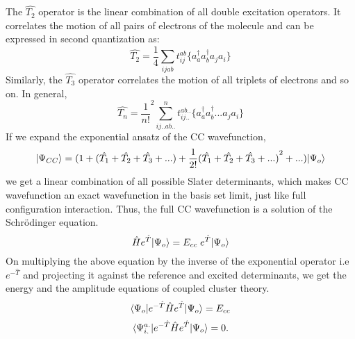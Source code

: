 The $\hat{T_2} $ operator is the linear combination of all double excitation operators.
It correlates the motion of all pairs of electrons of the molecule and can be expressed
in second quantization as:
\begin{equation}
\hat{T_2} = \frac{1}{4}\sum_{ijab}t^{ab}_{ij}\{a^\dagger_aa^\dagger_ba_ja_i\}
\end{equation}
Similarly, the ${\hat{T_3}}$ operator correlates the motion of all triplets of
electrons and so on. In general, \begin{equation}
\hat{T_n} = {\frac{1}{n!}}^2\sum_{ij..ab..}^nt^{ab..}_{ij..}\{a^\dagger_aa^\dagger_b...a_ja_i\}
\end{equation}
If we expand the exponential ansatz of the CC wavefunction,
\begin{equation}
| \Psi_{CC} \rangle = (1+(\hat{T_1} + \hat{T_2} + \hat{T_3} + ... ) + \frac{1}{2!}{(\hat{T_1} + \hat{T_2} + \hat{T_3} + ...)}^2 + ... )| \Psi_o \rangle
\end{equation}
we get a linear combination of all possible Slater determinants, which makes CC
wavefunction an exact wavefunction in the basis set limit, just like full
configuration interaction. Thus, the full CC
wavefunction is a solution of the Schr\"odinger equation.
\begin{equation}
\hat{H}e^{\hat{T}}| \Psi_o \rangle = E_{cc}\;e^{\hat{T}}| \Psi_o \rangle
\end{equation}
On multiplying the above equation by the inverse of the exponential operator i.e
$e^{-\hat{T}}$ and projecting it against the reference and excited
determinants, we get the energy and the amplitude equations of coupled cluster
theory.
\begin {equation}
\langle \Psi_o |e^{-\hat{T}}\hat{H}e^{\hat{T}}| \Psi_o \rangle = E_{cc}
\end{equation}
\begin{equation}
\langle \Psi^{a.}_{i.} |e^{-\hat{T}}\hat{H}e^{\hat{T}}| \Psi_o \rangle = 0 .
\end{equation} 
